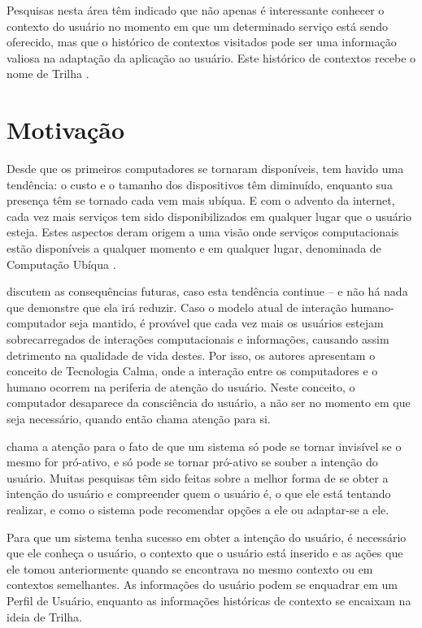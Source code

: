 Pesquisas nesta área têm indicado que não apenas é interessante conhecer o contexto do usuário no momento em que um determinado serviço está sendo oferecido, mas que o histórico de contextos visitados pode ser uma informação valiosa na adaptação da aplicação ao usuário. Este histórico de contextos recebe o nome de Trilha \cite{silva10}.



\section{Motivação}
\label{sec:motivacao}

Desde que os primeiros computadores se tornaram disponíveis, tem havido uma tendência: o custo e o tamanho dos dispositivos têm diminuído, enquanto sua presença têm se tornado cada vem mais ubíqua. E com o advento da internet, cada vez mais serviços tem sido disponibilizados em qualquer lugar que o usuário esteja. Estes aspectos deram origem a uma visão onde serviços computacionais estão disponíveis a qualquer momento e em qualquer lugar, denominada de Computação Ubíqua \cite{weiser91}.

 discutem as consequências futuras, caso esta tendência continue -- e não há nada que demonstre que ela irá reduzir. Caso o modelo atual de interação humano-computador seja mantido, é provável que cada vez mais os usuários estejam sobrecarregados de interações computacionais e informações, causando assim detrimento na qualidade de vida destes. Por isso, os autores apresentam o conceito de Tecnologia Calma, onde a interação entre os computadores e o humano ocorrem na periferia de atenção do usuário. Neste conceito, o computador desaparece da consciência do usuário, a não ser no momento em que seja necessário, quando então chama atenção para si.

 chama a atenção para o fato de que um sistema só pode se tornar invisível se o mesmo for pró-ativo, e só pode se tornar pró-ativo se souber a intenção do usuário. Muitas pesquisas têm sido feitas sobre a melhor forma de se obter a intenção do usuário e compreender quem o usuário é, o que ele está tentando realizar, e como o sistema pode recomendar opções a ele ou adaptar-se a ele.

Para que um sistema tenha sucesso em obter a intenção do usuário, é necessário que ele conheça o usuário, o contexto que o usuário está inserido e as ações que ele tomou anteriormente quando se encontrava no mesmo contexto ou em contextos semelhantes. As informações do usuário podem se enquadrar em um Perfil de Usuário, enquanto as informações históricas de contexto se encaixam na ideia de Trilha.

